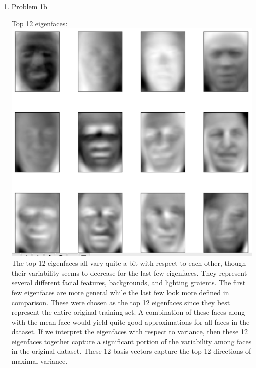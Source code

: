 \documentclass[11pt]{article}
\newcommand{\solution}[1]{{{\color{blue}{\bf Solution:} {#1}}}}
\begin{document}
\begin{enumerate}
\item Problem 1b

\solution{
Top 12 eigenfaces: \newline{}
\includegraphics[scale = 0.6]{eigenfaces.png}
\newline{}
The top 12 eigenfaces all vary quite a bit with respect to each other, though their variability seems to decrease for the last few eigenfaces. They represent several different facial features, backgrounds, and lighting graients. The first few eigenfaces are more general while the last few look more defined in comparison. These were chosen as the top 12 eigenfaces since they best represent the entire original training set. A combination of these faces along with the mean face would yield quite good approximations for all faces in the dataset. If we interpret the eigenfaces with respect to variance, then these 12 eigenfaces together capture a significant portion of the variability among faces in the original dataset. These 12 basis vectors capture the top 12 directions of maximal variance. 
}


\end{enumerate}
\end{document}
